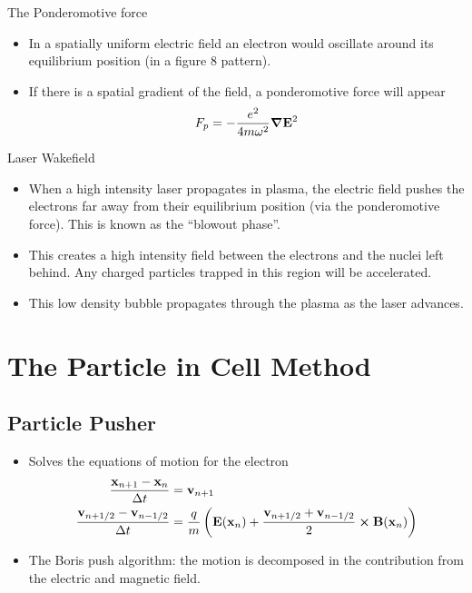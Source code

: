 \documentclass{beamer}
\begin{document}
\begin{frame}{The Ponderomotive force}
  \begin{itemize}
	\item In a spatially uniform electric field an electron would oscillate around
  	its equilibrium position (in a figure 8 pattern).
  	\item If there is a spatial gradient of the field, a ponderomotive force will
  	appear
  	\[
  	F_p = -\frac{e^2}{4m \omega^2} \grad{\vb{E}}^2
  	\]
	\end{itemize}
\end{frame}


\begin{frame}{Laser Wakefield}
  \begin{itemize}
    \item When a high intensity laser propagates in plasma, the
	electric field pushes the electrons far away from their equilibrium
	position (via the ponderomotive force). This is known as the ``blowout phase''.
	\item This creates a high intensity field between the electrons and the
	nuclei left behind. Any charged particles trapped in this region will be accelerated.
	\item This low density bubble propagates through the plasma as the laser advances.
	\end{itemize}
\end{frame}

\section{The Particle in Cell Method}

\subsection{Particle Pusher}

\begin{frame}
	\begin{itemize}
		\item Solves the equations of motion for the electron
		\begin{subequations}
		  \begin{align*}
		    \frac{\vb{x}_{n+1}-\vb{x}_n}{\Delta t} &= \vb{v}_{n+1} \\
		    \frac{\vb{v}_{n+1/2}-\vb{v}_{n-1/2}}{\Delta t} &= \frac{q}{m}
		      \left(\vb{E}(\vb{x}_n) + \frac{\vb{v}_{n+1/2}+\vb{v}_{n-1/2}}{2} \cp \vb{B}(\vb{x}_n)\right)
		  \end{align*}
		\end{subequations}
		\item The Boris push algorithm: the motion is decomposed in the contribution from the electric
		and magnetic field.
	\end{itemize}
\end{frame}
\end{document}
